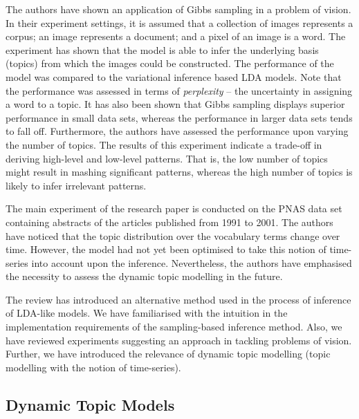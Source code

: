 \documentclass{mprop}
\begin{document}
\par The authors have shown an application of Gibbs sampling in a problem of vision. In their experiment settings, it is assumed that a collection of images represents a corpus; an image represents a document; and a pixel of an image is a word. The experiment has shown that the model is able to infer the underlying basis (topics) from which the images could be constructed. The performance of the model was compared to the variational inference based LDA models. Note that the performance was assessed in terms of \textit{perplexity} -- the uncertainty in assigning a word to a topic. It has also been shown that Gibbs sampling displays superior performance in small data sets, whereas the performance in larger data sets tends to fall off. Furthermore, the authors have assessed the performance upon varying the number of topics. The results of this experiment indicate a trade-off in deriving high-level and low-level patterns. That is, the low number of topics might result in mashing significant patterns, whereas the high number of topics is likely to infer irrelevant patterns.

\par The main experiment of the research paper is conducted on the PNAS data set containing abstracts of the articles published from 1991 to 2001. The authors have noticed that the topic distribution over the vocabulary terms change over time. However, the model had not yet been optimised to take this notion of time-series into account upon the inference. Nevertheless, the authors have emphasised the necessity to assess the dynamic topic modelling in the future. 

\par The review has introduced an alternative method used in the process of inference of LDA-like models. We have familiarised with the intuition in the implementation requirements of the sampling-based inference method. Also, we have reviewed experiments suggesting an approach in tackling problems of vision. Further, we have introduced the relevance of dynamic topic modelling (topic modelling with the notion of time-series). 

\subsection{Dynamic Topic Models}
\end{document}
